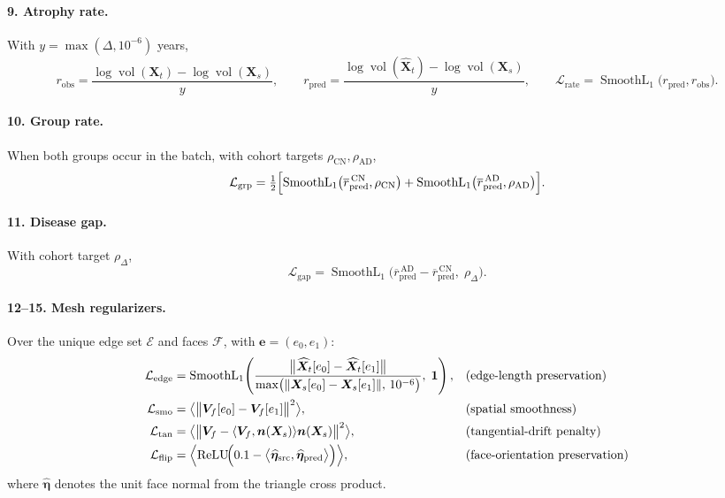 \documentclass[11pt]{article}
\newcommand{\X}{\bm{X}}
\newcommand{\V}{\bm{V}}
\newcommand{\nrm}{\bm{n}}
\newcommand{\Loss}{\mathcal{L}}
\newcommand{\Faces}{\mathcal{F}}
\newcommand{\Edges}{\mathcal{E}}
\newcommand{\SL}{\operatorname{SmoothL}_1}
\newcommand{\vol}{\operatorname{vol}}
\begin{document}
\paragraph{9. Atrophy rate.} With $y = \max(\Delta, 10^{-6})$ years,
\begin{equation}
  r_{\mathrm{obs}} = \frac{\log \vol(\X_t) - \log \vol(\X_s)}{y}, \qquad
  r_{\mathrm{pred}} = \frac{\log \vol(\widehat{\X}_t) - \log \vol(\X_s)}{y}, \qquad
  \Loss_{\mathrm{rate}} = \SL\bigl(r_{\mathrm{pred}}, r_{\mathrm{obs}}\bigr).
\end{equation}

\paragraph{10. Group rate.} When both groups occur in the batch, with cohort targets
$\rho_{\mathrm{CN}}, \rho_{\mathrm{AD}}$,
\begin{equation}
  \Loss_{\mathrm{grp}} = \tfrac{1}{2}\Bigl[
    \SL\bigl(\overline{r}_{\mathrm{pred}}^{\,\mathrm{CN}}, \rho_{\mathrm{CN}}\bigr) +
    \SL\bigl(\overline{r}_{\mathrm{pred}}^{\,\mathrm{AD}}, \rho_{\mathrm{AD}}\bigr) \Bigr].
\end{equation}

\paragraph{11. Disease gap.} With cohort target $\rho_{\Delta}$,
\begin{equation}
  \Loss_{\mathrm{gap}} = \SL\bigl(
    \overline{r}_{\mathrm{pred}}^{\,\mathrm{AD}} - \overline{r}_{\mathrm{pred}}^{\,\mathrm{CN}},\;
    \rho_{\Delta}\bigr).
\end{equation}

\paragraph{12--15. Mesh regularizers.} Over the unique edge set $\Edges$ and faces
$\Faces$, with $\bm{e} = (e_0, e_1)$:
\begin{align}
  \Loss_{\mathrm{edge}} &= \SL\!\left(
      \frac{\bigl\| \widehat{\X}_t[e_0] - \widehat{\X}_t[e_1] \bigr\|}
           {\max\bigl(\| \X_s[e_0] - \X_s[e_1] \|,\, 10^{-6}\bigr)},\; \bm{1}\right),
  &&\text{(edge-length preservation)}\\
  \Loss_{\mathrm{smo}} &= \bigl\langle \bigl\| \V_f[e_0] - \V_f[e_1] \bigr\|^2 \bigr\rangle,
  &&\text{(spatial smoothness)}\\
  \Loss_{\mathrm{tan}} &= \bigl\langle \bigl\| \V_f - \langle \V_f, \nrm(\X_s)\rangle \nrm(\X_s) \bigr\|^2 \bigr\rangle,
  &&\text{(tangential-drift penalty)}\\
  \Loss_{\mathrm{flip}} &= \Bigl\langle \operatorname{ReLU}\!\Bigl(
      0.1 - \bigl\langle \widehat{\bm{\eta}}_{\mathrm{src}}, \widehat{\bm{\eta}}_{\mathrm{pred}} \bigr\rangle
      \Bigr) \Bigr\rangle,
  &&\text{(face-orientation preservation)}
\end{align}
where $\widehat{\bm{\eta}}$ denotes the unit face normal from the triangle cross product.
\end{document}
